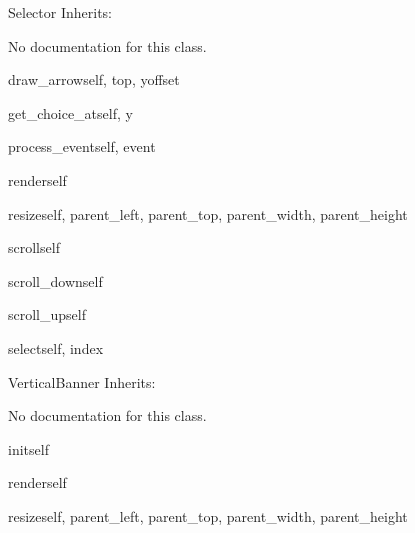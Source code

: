 \begin{classdesc*}{Selector}
Inherits:

No documentation for this class.

\begin{methoddesc}{draw_arrow}{self, top, yoffset}
\end{methoddesc}

\begin{methoddesc}{get_choice_at}{self, y}
\end{methoddesc}

\begin{methoddesc}{process_event}{self, event}
\end{methoddesc}

\begin{methoddesc}{render}{self}
\end{methoddesc}

\begin{methoddesc}{resize}{self, parent_left, parent_top, parent_width, parent_height}
\end{methoddesc}

\begin{methoddesc}{scroll}{self}
\end{methoddesc}

\begin{methoddesc}{scroll_down}{self}
\end{methoddesc}

\begin{methoddesc}{scroll_up}{self}
\end{methoddesc}

\begin{methoddesc}{select}{self, index}
\end{methoddesc}

\end{classdesc*}

\begin{classdesc*}{VerticalBanner}
Inherits:

No documentation for this class.

\begin{methoddesc}{init}{self}
\end{methoddesc}

\begin{methoddesc}{render}{self}
\end{methoddesc}

\begin{methoddesc}{resize}{self, parent_left, parent_top, parent_width, parent_height}
\end{methoddesc}

\end{classdesc*}

